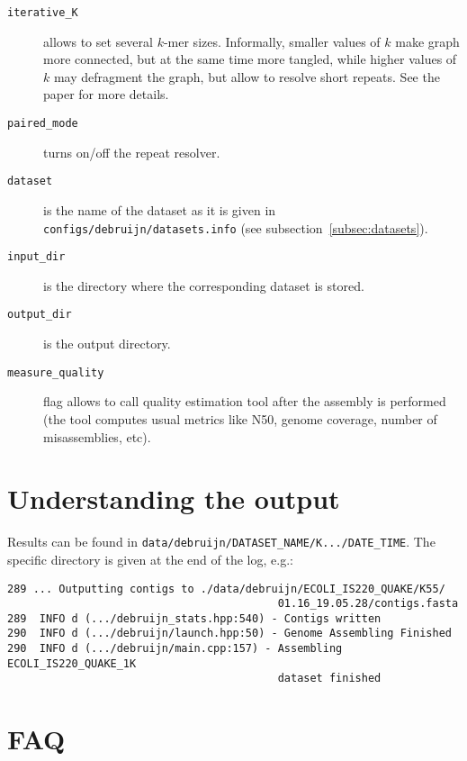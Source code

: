 \documentclass{article}
\begin{document}
\begin{description}
\item[{\tt iterative\_K}] allows to set several $k$-mer sizes. Informally, smaller values of $k$ make graph more connected,
but at the same time more tangled, while higher values of $k$ may defragment the graph, but allow to resolve short repeats.
See the paper for more details.
\item[{\tt paired\_mode}] turns on/off the repeat resolver.
\item[{\tt dataset}] is the name of the dataset as it is given in {\tt configs/debruijn/datasets.info} (see subsection~\ref{subsec:datasets}).
\item[{\tt input\_dir}] is the directory where the corresponding dataset is stored.
\item[{\tt output\_dir}] is the output directory.
\item[{\tt measure\_quality}] flag allows to call quality estimation tool after the assembly is performed (the tool computes usual
metrics like N50, genome coverage, number of misassemblies, etc).
\end{description}

\section{Understanding the output}
Results can be found in {\tt data/debruijn/DATASET\_NAME/K.../DATE\_TIME}.
The specific directory is given at the end of the log, e.g.:
\begin{lstlisting}
289 ... Outputting contigs to ./data/debruijn/ECOLI_IS220_QUAKE/K55/
                                          01.16_19.05.28/contigs.fasta
289  INFO d (.../debruijn_stats.hpp:540) - Contigs written
290  INFO d (.../debruijn/launch.hpp:50) - Genome Assembling Finished
290  INFO d (.../debruijn/main.cpp:157) - Assembling ECOLI_IS220_QUAKE_1K 
                                          dataset finished
\end{lstlisting}


\section{FAQ}
\end{document}
